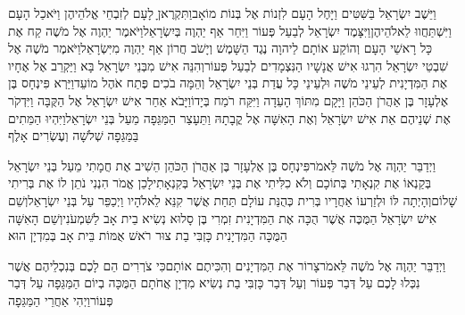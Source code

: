 \documentclass[../main/main.tex]{subfiles}
\begin{document}
\begin{multicols}{\ncols}
וַיֵּשֶׁב יִשְׂרָאֵל בַּשִּׁטִּים וַיָּחֶל הָעָם לִזְנוֹת אֶל בְּנוֹת מוֹאָב\PreVerseSpace{}וַתִּקְרֶאןָ לָעָם לְזִבְחֵי אֱלֹהֵיהֶן וַיֹּאכַל הָעָם וַיִּשְׁתַּחֲווּ לֵאלֹהֵיהֶן\PreVerseSpace{}וַיִּצָּמֶד יִשְׂרָאֵל לְבַעַל פְּעוֹר וַיִּחַר אַף יַהְוֶה בְּיִשְׂרָאֵל\PreVerseSpace{}וַיֹּאמֶר יַהְוֶה אֶל מֹשֶׁה קַח אֶת כָּל רָאשֵׁי הָעָם וְהוֹקַע אוֹתָם לַיהוָה נֶגֶד הַשָּׁמֶשׁ וְיָשֹׁב חֲרוֹן אַף יַהְוֶה מִיִּשְׂרָאֵל\PreVerseSpace{}וַיֹּאמֶר מֹשֶׁה אֶל שִׁבְטֵי\SubEnd{} יִשְׂרָאֵל הִרְגוּ אִישׁ אֲנָשָׁיו הַנִּצְמָדִים לְבַעַל פְּעוֹר\PreVerseSpace{}וְהִנֵּה אִישׁ מִבְּנֵי יִשְׂרָאֵל בָּא וַיַּקְרֵב אֶל אֶחָיו אֶת הַמִּדְיָנִית לְעֵינֵי מֹשֶׁה וּלְעֵינֵי כָּל עֲדַת בְּנֵי יִשְׂרָאֵל וְהֵמָּה בֹכִים פֶּתַח אֹהֶל מוֹעֵד\PreVerseSpace{}וַיַּרְא פִּינְחָס בֶּן אֶלְעָזָר בֶּן אַהֲרֹן הַכֹּהֵן וַיָּקָם מִתּוֹךְ הָעֵדָה וַיִּקַּח רֹמַח בְּיָדוֹ\PreVerseSpace{}וַיָּבֹא אַחַר אִישׁ יִשְׂרָאֵל אֶל הַקֻּבָּה וַיִּדְקֹר אֶת שְׁנֵיהֶם אֵת אִישׁ יִשְׂרָאֵל וְאֶת הָאִשָּׁה אֶל קֳבָתָהּ וַתֵּעָצַר הַמַּגֵּפָה מֵעַל בְּנֵי יִשְׂרָאֵל\PreVerseSpace{}וַיִּהְיוּ הַמֵּתִים בַּמַּגֵּפָה שְׁלֹשָׁה\SubEnd{} וְעֶשְׂרִים אָלֶף\OpenSection{}\par
{}וַיְדַבֵּר יַהְוֶה אֶל מֹשֶׁה לֵּאמֹר\PreVerseSpace{}פִּינְחָס בֶּן אֶלְעָזָר בֶּן אַהֲרֹן הַכֹּהֵן הֵשִׁיב אֶת חֲמָתִי מֵעַל בְּנֵי יִשְׂרָאֵל בְּקַנְאוֹ אֶת קִנְאָתִי בְּתוֹכָם וְלֹא כִלִּיתִי אֶת בְּנֵי יִשְׂרָאֵל בְּקִנְאָתִי\PreVerseSpace{}לָכֵן אֱמֹר הִנְנִי נֹתֵן לוֹ אֶת בְּרִיתִי שָׁלוֹם\PreVerseSpace{}וְהָיְתָה לּוֹ וּלְזַרְעוֹ אַחֲרָיו בְּרִית כְּהֻנַּת עוֹלָם תַּחַת אֲשֶׁר קִנֵּא לֵאלֹהָיו וַיְכַפֵּר עַל בְּנֵי יִשְׂרָאֵל\PreVerseSpace{}וְשֵׁם אִישׁ יִשְׂרָאֵל הַמֻּכֶּה אֲשֶׁר הֻכָּה אֶת הַמִּדְיָנִית זִמְרִי בֶּן סָלוּא נְשִׂיא בֵית אָב לַשִּׁמְעֹנִי\PreVerseSpace{}וְשֵׁם הָאִשָּׁה הַמֻּכָּה הַמִּדְיָנִית כָּזְבִּי בַת צוּר רֹאשׁ אֻמּוֹת בֵּית אָב בְּמִדְיָן הוּא\OpenSection{}\par
{}וַיְדַבֵּר יַהְוֶה אֶל מֹשֶׁה לֵּאמֹר\PreVerseSpace{}צָרוֹר אֶת הַמִּדְיָנִים וְהִכִּיתֶם אוֹתָם\PreVerseSpace{}כִּי צֹרְרִים הֵם לָכֶם בְּנִכְלֵיהֶם אֲשֶׁר נִכְּלוּ לָכֶם עַל דְּבַר פְּעוֹר וְעַל דְּבַר כָּזְבִּי בַת נְשִׂיא מִדְיָן אֲחֹתָם הַמֻּכָּה בְיוֹם הַמַּגֵּפָה עַל דְּבַר פְּעוֹר\PreVerseSpace{}וַיְהִי אַחֲרֵי הַמַּגֵּפָה\OpenSection{}\par

\end{multicols}
\end{document}
